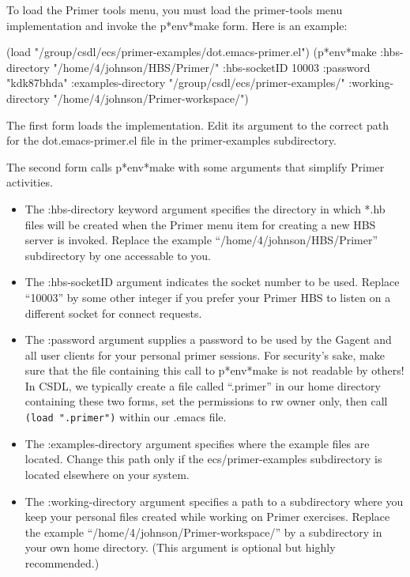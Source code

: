 To load the Primer tools menu, you must load the primer-tools menu 
implementation and invoke the p*env*make form.  Here is an example:

\begin{code}
(load "/group/csdl/ecs/primer-examples/dot.emacs-primer.el")
(p*env*make :hbs-directory "/home/4/johnson/HBS/Primer/" 
            :hbs-socketID 10003 
            :password "kdk87bhda"
            :examples-directory "/group/csdl/ecs/primer-examples/"
            :working-directory "/home/4/johnson/Primer-workspace/")
\end{code}

The first form loads the implementation. Edit its argument to the correct
path for the dot.emacs-primer.el file in the primer-examples subdirectory.

The second form calls p*env*make with some arguments that simplify Primer
activities. 
\begin{itemize}
\item The :hbs-directory keyword argument specifies the directory in
  which *.hb files will be created when the Primer menu item for creating
  a new HBS server is invoked.  Replace the example
  ``/home/4/johnson/HBS/Primer'' subdirectory by one accessable to you.
\item The :hbs-socketID argument indicates the socket number to be
  used. Replace ``10003'' by some other integer if you prefer your Primer
  HBS to listen on a different socket for connect requests.
\item The :password argument supplies a password to be used by the Gagent
  and all user clients for your personal primer sessions.  For security's
  sake, make sure that the file containing this call to p*env*make is not
  readable by others!  In CSDL, we typically create a file called
  ``.primer'' in our home directory containing these two forms, set the
  permissions to rw owner only, then call {\tt (load ".primer")} within 
  our .emacs file.  
\item The :examples-directory argument specifies where the example files
  are located.  Change this path only if the ecs/primer-examples subdirectory
  is located elsewhere on your system.
\item The :working-directory argument specifies a path to a subdirectory
  where you keep your personal files created while working on Primer
  exercises.  Replace the example ``/home/4/johnson/Primer-workspace/'' by a
  subdirectory in your own home directory.  (This argument is optional but 
  highly recommended.)
\end{itemize} 

